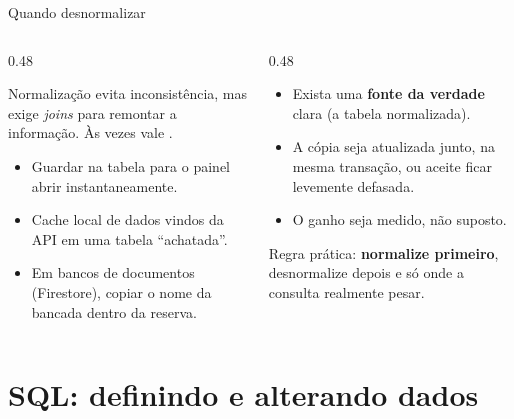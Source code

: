 \documentclass[aspectratio=169,10pt]{beamer}
\begin{document}
\begin{frame}{Quando desnormalizar}
  \begin{columns}[T]
    \begin{column}{0.48\textwidth}
      \begin{caixadestaque}
        Normalização evita inconsistência, mas exige \emph{joins} para remontar a informação. Às vezes vale .
      \end{caixadestaque}
      \begin{exemplo}
        \begin{itemize}
          \item Guardar  na tabela  para o painel abrir instantaneamente.
          \item Cache local de dados vindos da API em uma tabela ``achatada''.
          \item Em bancos de documentos (Firestore), copiar o nome da bancada dentro da reserva.
        \end{itemize}
      \end{exemplo}
    \end{column}
    \begin{column}{0.48\textwidth}
      \begin{atencao}[Condições]
        \begin{itemize}
          \item Exista uma \textbf{fonte da verdade} clara (a tabela normalizada).
          \item A cópia seja atualizada junto, na mesma transação, ou aceite ficar levemente defasada.
          \item O ganho seja medido, não suposto.
        \end{itemize}
      \end{atencao}
      \begin{dica}
        Regra prática: \textbf{normalize primeiro}, desnormalize depois e só onde a consulta realmente pesar.
      \end{dica}
    \end{column}
  \end{columns}
\end{frame}

\section{SQL: definindo e alterando dados}
\end{document}
